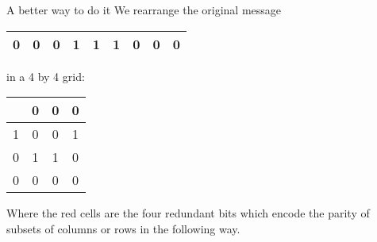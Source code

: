 \begin{frame}{A better way to do it}
We rearrange the original message
\begin{tabular}{|c|c|c|c|c|c|c|c|c|}
    \hline
    \rowcolor{blue!20} 0 & 0 & 0 & 1 &  1 & 1 & 0 & 0 & 0 \\
    \hline
\end{tabular}
in a 4 by 4 grid: \\ 
\begin{center}
\pause
\begin{tabular}{|c|c|c|c|}
\hline
     &  \cellcolor{red!20} 0 & \cellcolor{red!20} 0 & \cellcolor{blue!20}  0  \\ \hline
    \cellcolor{red!20} 1 & \cellcolor{blue!20} 0 & \cellcolor{blue!20}  0 & \cellcolor{blue!20} 1  \\ \hline
    \cellcolor{red!20} 0 & \cellcolor{blue!20} 1 &\cellcolor{blue!20}  1 &\cellcolor{blue!20} 0  \\ \hline
    \rowcolor{blue!20}0 & 0 & 0 & 0  \\ \hline
\end{tabular}
\end{center}
\pause
Where the red cells are the four redundant bits which encode the parity of subsets of columns or rows in the following way. \\
\pause
{}
\end{frame}
